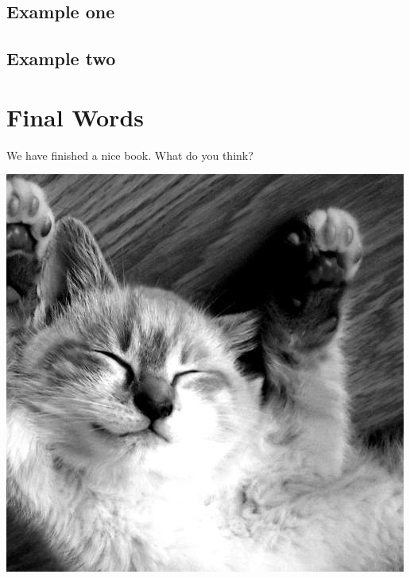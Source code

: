 \documentclass[
]{book}
\begin{document}
\hypertarget{example-one}{%
\section{Example one}\label{example-one}}

\hypertarget{example-two}{%
\section{Example two}\label{example-two}}

\hypertarget{final-words}{%
\chapter{Final Words}\label{final-words}}

We have finished a nice book. What do you think?

\includegraphics{images/500.jpg}
\end{document}

